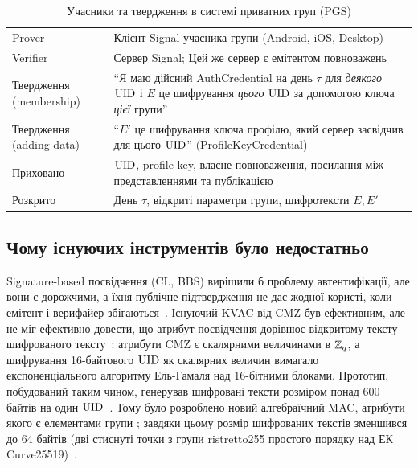 \begin{table}[!ht]
  \centering
  \small
  \begin{tabularx}{\linewidth}{@{}l X@{}}
    \toprule
    Prover                   & Клієнт Signal учасника групи (Android, iOS, Desktop)                                    \\
    Verifier                 & Сервер Signal; Цей же сервер є емітентом повноважень                                    \\
    Твердження (membership)  & \enquote{Я маю дійсний AuthCredential на день $\tau$ для \emph{деякого} $\mathrm{UID}$ і $E$ це
    шифрування \emph{цього} $\mathrm{UID}$ за допомогою ключа \emph{цієї} групи}                                               \\
    Твердження (adding data) & \enquote{$E'$  це шифрування ключа профілю, який сервер засвідчив для цього
    $\mathrm{UID}$} (ProfileKeyCredential)                                                                                     \\
    Приховано & $\mathrm{UID}$, profile key, власне повноваження, посилання між представленнями та публікацією                 \\
    Розкрито                 & День $\tau$, відкриті параметри групи, шифротексти $E, E'$                              \\
    \bottomrule
  \end{tabularx}
  \caption{Учасники та твердження в системі приватних груп (PGS)}
  \label{tab:roles}
\end{table}

\subsection{Чому існуючих інструментів було недостатньо}

Signature-based посвідчення (CL, BBS) вирішили б проблему автентифікації, але вони є дорожчими, а їхня публічне 
підтвердження не дає жодної користі, коли емітент і верифайер збігаються~\cite{SignalBlog2019}. Існуючий KVAC від 
CMZ був ефективним, але не міг ефективно довести, що атрибут посвідчення дорівнює відкритому тексту шифрованого 
тексту~\cite{SignalBlog2019}: атрибути CMZ є скалярними величинами в $\mathbb{Z}_q$, а шифрування 16-байтового $\mathrm{UID}$ як 
скалярних величин вимагало експоненціального алгоритму Ель-Гамаля над 16-бітними блоками. Прототип, побудований 
таким чином, генерував шифровані тексти розміром понад 600 байтів на один $\mathrm{UID}$~\cite{CPZ20}. Тому було розроблено 
новий алгебраїчний MAC, атрибути якого є елементами групи ; завдяки цьому розмір шифрованих текстів зменшився до 
64 байтів (дві стиснуті точки з групи ristretto255 простого порядку над ЕК Curve25519)~\cite{CPZ20}.

